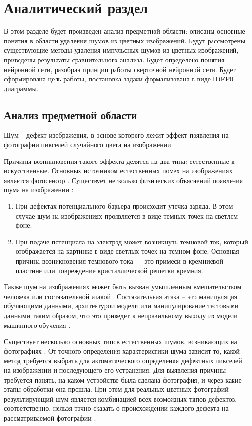 \section{Аналитический раздел}
В этом разделе будет произведен анализ предметной области: описаны основные понятия в области удаления шумов из цветных изображений.
Будут рассмотрены существующие методы удаления импульсных шумов из цветных изображений, приведены результаты сравнительного анализа.
Будет определено понятия нейронной сети, разобран принцип работы сверточной нейронной сети.
Будет сформирована цель работы, постановка задачи формализована в виде IDEF0-диаграммы.

\subsection{Анализ предметной области}
Шум -- дефект изображения, в основе которого лежит эффект появления на фотографии пикселей случайного цвета на изображении \cite{shum}. 

Причины возникновения такого эффекта делятся на два типа: естественные и искусственные.
Основных источником естественных помех на изображениях является фотосенсор \cite{shum}.
Существует несколько физических объяснений появления шума на изображении \cite{causes}:
\begin{enumerate}
	\item При дефектах потенциального барьера происходит утечка заряда. В этом случае шум на изображениях проявляется в виде темных точек на светлом фоне.
	\item При подаче потенциала на электрод может возникнуть темновой ток, который отображается на картинке в виде светлых точек на темном фоне. Основная причина возникновения темнового тока — это примеси в кремниевой пластине или повреждение кристаллической решетки кремния. 
\end{enumerate}

Также шум на изображениях может быть вызван умышленным вмешательством человека или состязательной атакой \cite{impact}. 
Состязательная атака – это манипуляция обучающими данными, архитектурой модели или манипулирование тестовыми данными таким
образом, что это приведет к неправильному выходу из модели машинного обучения \cite{impact}.


Существует несколько основных типов естественных шумов, возникающих на фотографиях \cite{filterTechincs}.
От точного определения характеристики шума зависит то, какой метод требуется выбрать для автоматического определения дефектных пикселей на изображении и последующего его устранения.
Для выявления причины требуется понять, на каком устройстве была сделана фотография, и через какие этапы обработки она прошла.
При этом для реальных цветных фотографий результирующий шум является комбинацией всех возможных типов дефектов, соответственно, нельзя точно сказать о происхождении каждого дефекта на рассматриваемой фотографии \cite{mix}.

